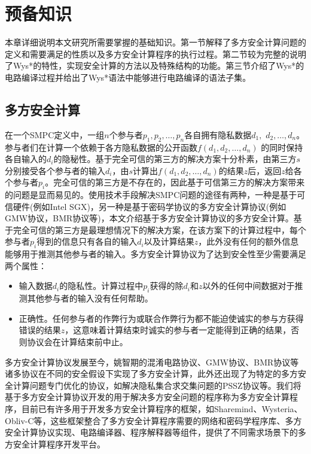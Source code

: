 \chapter{预备知识}\label{Guide}
本章详细说明本文研究所需要掌握的基础知识。第一节解释了多方安全计算问题的定义和需要满足的性质以及多方安全计算程序的执行过程。第二节较为完整的说明了Wys*的特性，实现安全计算的方法以及特殊结构的功能。第三节介绍了Wys*的电路编译过程并给出了Wys*语法中能够进行电路编译的语法子集。
\section{多方安全计算}
在一个SMPC定义中\citep{evans2017pragmatic}，一组$n$个参与者$p_1,p_2,\dots,p_n$各自拥有隐私数据$d_1,$ $d_2,\dots,d_n$。参与者们在计算一个依赖于各方隐私数据的公开函数$f(d_1,d_2,\dots,d_n)$ 的同时保持各自输入的$d_i$的隐秘性。基于完全可信的第三方的解决方案十分朴素，由第三方$s$分别接受各个参与者的输入$d_i$，由$s$计算出$f(d_1,d_2,\dots,d_n)$的结果$z$后，返回$z$给各个参与者$p_i$。完全可信的第三方是不存在的，因此基于可信第三方的解决方案带来的问题是显而易见的。使用技术手段解决SMPC问题的途径有两种，一种是基于可信硬件(例如Intel SGX)，另一种是基于密码学协议的多方安全计算协议(例如GMW协议，BMR协议等)，本文介绍基于多方安全计算协议的多方安全计算。基于完全可信的第三方是最理想情况下的解决方案，在该方案下的计算过程中，每个参与者$p_i$得到的信息只有各自的输入$d_i$以及计算结果$z$，此外没有任何的额外信息能够用于推测其他参与者的输入。多方安全计算协议为了达到安全性至少需要满足两个属性：
\begin{itemize}
	\item 输入数据$d_i$的隐私性。计算过程中$p_i$获得的除$d_i$和$z$以外的任何中间数据对于推测其他参与者的输入没有任何帮助。
	\item 正确性。任何参与者的作弊行为或联合作弊行为都不能迫使诚实的参与方获得错误的结果$z$，这意味着计算结束时诚实的参与者一定能得到正确的结果，否则协议会在计算结束前中止。
\end{itemize}

多方安全计算协议发展至今，姚智期的混淆电路协议、GMW协议\citep{goldreich2019play}、BMR协议\citep{beaver1990round}等诸多协议在不同的安全假设下实现了多方安全计算，此外还出现了为特定的多方安全计算问题专门优化的协议，如解决隐私集合求交集问题的PSSZ协议\citep{pinkas2015phasing}等。我们将基于多方安全计算协议开发的用于解决多方安全问题的程序称为多方安全计算程序，目前已有许多用于开发多方安全计算程序的框架，如Sharemind、Wysteria、Obliv-C等\citep{bogdanov2008sharemind, rastogi2014wysteria, zahur2015obliv}，这些框架整合了多方安全计算程序需要的网络和密码学程序库、多方安全计算协议实现、电路编译器、程序解释器等组件，提供了不同需求场景下的多方安全计算程序开发平台。

